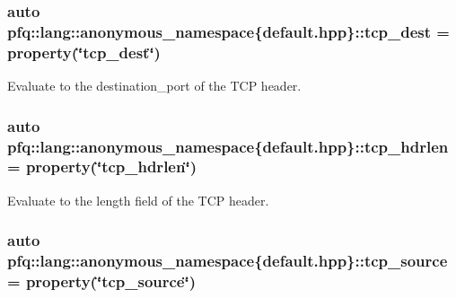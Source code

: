 \subsubsection[{\texorpdfstring{tcp\+\_\+dest}{tcp_dest}}]{\setlength{\rightskip}{0pt plus 5cm}auto pfq\+::lang\+::anonymous\+\_\+namespace\{default.\+hpp\}\+::tcp\+\_\+dest = {\bf property}(\char`\"{}tcp\+\_\+dest\char`\"{})}\hypertarget{namespacepfq_1_1lang_1_1anonymous__namespace_02default_8hpp_03_a83741c074712431d2e75f09744bb7486}{}\label{namespacepfq_1_1lang_1_1anonymous__namespace_02default_8hpp_03_a83741c074712431d2e75f09744bb7486}


Evaluate to the {\ttfamily destination\+\_\+port} of the T\+CP header. 

\subsubsection[{\texorpdfstring{tcp\+\_\+hdrlen}{tcp_hdrlen}}]{\setlength{\rightskip}{0pt plus 5cm}auto pfq\+::lang\+::anonymous\+\_\+namespace\{default.\+hpp\}\+::tcp\+\_\+hdrlen = {\bf property}(\char`\"{}tcp\+\_\+hdrlen\char`\"{})}\hypertarget{namespacepfq_1_1lang_1_1anonymous__namespace_02default_8hpp_03_a678163384b58e4682bdbaf7efdd22cfb}{}\label{namespacepfq_1_1lang_1_1anonymous__namespace_02default_8hpp_03_a678163384b58e4682bdbaf7efdd22cfb}


Evaluate to the {\ttfamily length} field of the T\+CP header. 

\subsubsection[{\texorpdfstring{tcp\+\_\+source}{tcp_source}}]{\setlength{\rightskip}{0pt plus 5cm}auto pfq\+::lang\+::anonymous\+\_\+namespace\{default.\+hpp\}\+::tcp\+\_\+source = {\bf property}(\char`\"{}tcp\+\_\+source\char`\"{})}\hypertarget{namespacepfq_1_1lang_1_1anonymous__namespace_02default_8hpp_03_a367a9ec6d91677553073c54a059b391d}{}\label{namespacepfq_1_1lang_1_1anonymous__namespace_02default_8hpp_03_a367a9ec6d91677553073c54a059b391d}


